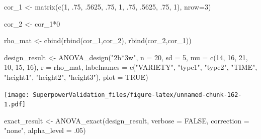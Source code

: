 \documentclass[
]{book}
\newenvironment{Shaded}{\begin{snugshade}}{\end{snugshade}}
\newcommand{\AttributeTok}[1]{\textcolor[rgb]{0.77,0.63,0.00}{#1}}
\newcommand{\ConstantTok}[1]{\textcolor[rgb]{0.00,0.00,0.00}{#1}}
\newcommand{\DecValTok}[1]{\textcolor[rgb]{0.00,0.00,0.81}{#1}}
\newcommand{\FunctionTok}[1]{\textcolor[rgb]{0.00,0.00,0.00}{#1}}
\newcommand{\NormalTok}[1]{#1}
\newcommand{\OtherTok}[1]{\textcolor[rgb]{0.56,0.35,0.01}{#1}}
\newcommand{\SpecialCharTok}[1]{\textcolor[rgb]{0.00,0.00,0.00}{#1}}
\newcommand{\StringTok}[1]{\textcolor[rgb]{0.31,0.60,0.02}{#1}}
\begin{document}
\begin{Shaded}
\begin{Highlighting}[]
\NormalTok{cor\_1 }\OtherTok{\textless{}{-}} \FunctionTok{matrix}\NormalTok{(}\FunctionTok{c}\NormalTok{(}\DecValTok{1}\NormalTok{, .}\DecValTok{75}\NormalTok{, .}\DecValTok{5625}\NormalTok{,}
\NormalTok{                  .}\DecValTok{75}\NormalTok{, }\DecValTok{1}\NormalTok{, .}\DecValTok{75}\NormalTok{,}
\NormalTok{                  .}\DecValTok{5625}\NormalTok{, .}\DecValTok{75}\NormalTok{, }\DecValTok{1}\NormalTok{), }\AttributeTok{nrow=}\DecValTok{3}\NormalTok{)}

\NormalTok{cor\_2 }\OtherTok{\textless{}{-}}\NormalTok{ cor\_1}\SpecialCharTok{*}\DecValTok{0}

\NormalTok{rho\_mat }\OtherTok{\textless{}{-}} \FunctionTok{cbind}\NormalTok{(}\FunctionTok{rbind}\NormalTok{(cor\_1,cor\_2),}
                      \FunctionTok{rbind}\NormalTok{(cor\_2,cor\_1))}

\NormalTok{design\_result }\OtherTok{\textless{}{-}} \FunctionTok{ANOVA\_design}\NormalTok{(}\StringTok{"2b*3w"}\NormalTok{,}
                              \AttributeTok{n =} \DecValTok{20}\NormalTok{,}
                              \AttributeTok{sd =} \DecValTok{5}\NormalTok{,}
                              \AttributeTok{mu =} \FunctionTok{c}\NormalTok{(}\DecValTok{14}\NormalTok{, }\DecValTok{16}\NormalTok{, }\DecValTok{21}\NormalTok{,}
                                     \DecValTok{10}\NormalTok{, }\DecValTok{15}\NormalTok{, }\DecValTok{16}\NormalTok{),}
                              \AttributeTok{r =}\NormalTok{ rho\_mat,}
                              \AttributeTok{labelnames =} \FunctionTok{c}\NormalTok{(}\StringTok{"VARIETY"}\NormalTok{, }
                                             \StringTok{"type1"}\NormalTok{, }\StringTok{"type2"}\NormalTok{,}
                                             \StringTok{"TIME"}\NormalTok{, }
                                             \StringTok{"height1"}\NormalTok{, }\StringTok{"height2"}\NormalTok{, }
                                             \StringTok{"height3"}\NormalTok{),}
                              \AttributeTok{plot =} \ConstantTok{TRUE}\NormalTok{)}
\end{Highlighting}
\end{Shaded}

\texttt{[image: SuperpowerValidation\_files/figure-latex/unnamed-chunk-162-1.pdf]}

\begin{Shaded}
\begin{Highlighting}[]
\NormalTok{exact\_result }\OtherTok{\textless{}{-}} \FunctionTok{ANOVA\_exact}\NormalTok{(design\_result, }\AttributeTok{verbose =} \ConstantTok{FALSE}\NormalTok{,}
                            \AttributeTok{correction =} \StringTok{"none"}\NormalTok{,}
                            \AttributeTok{alpha\_level =}\NormalTok{ .}\DecValTok{05}\NormalTok{)}
\end{Highlighting}
\end{Shaded}
\end{document}
